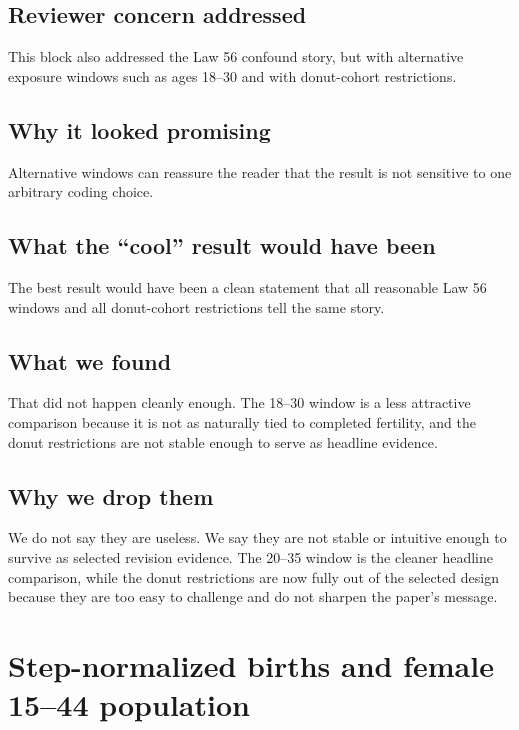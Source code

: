 \documentclass[11pt]{article}
\begin{document}
\subsection*{Reviewer concern addressed}

This block also addressed the Law 56 confound story, but with alternative exposure windows such as ages 18--30 and with donut-cohort restrictions.

\subsection*{Why it looked promising}

Alternative windows can reassure the reader that the result is not sensitive to one arbitrary coding choice.

\subsection*{What the ``cool'' result would have been}

The best result would have been a clean statement that all reasonable Law 56 windows and all donut-cohort restrictions tell the same story.

\subsection*{What we found}

That did not happen cleanly enough. The 18--30 window is a less attractive comparison because it is not as naturally tied to completed fertility, and the donut restrictions are not stable enough to serve as headline evidence.

\subsection*{Why we drop them}

We do not say they are useless. We say they are not stable or intuitive enough to survive as selected revision evidence. The 20--35 window is the cleaner headline comparison, while the donut restrictions are now fully out of the selected design because they are too easy to challenge and do not sharpen the paper's message.

\section{Step-normalized births and female 15--44 population}
\end{document}
